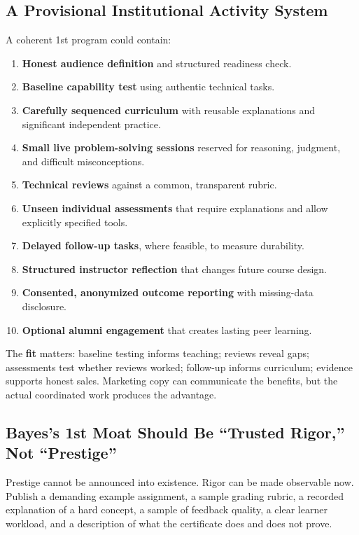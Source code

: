 \subsection{A Provisional Institutional Activity System}
\label{sec:provisional_activity_system}

A coherent 1st program could contain:
\begin{enumerate}
    \item \textbf{Honest audience definition} and structured readiness check.
    \item \textbf{Baseline capability test} using authentic technical tasks.
    \item \textbf{Carefully sequenced curriculum} with reusable explanations and significant independent practice.
    \item \textbf{Small live problem-solving sessions} reserved for reasoning, judgment, and difficult misconceptions.
    \item \textbf{Technical reviews} against a common, transparent rubric.
    \item \textbf{Unseen individual assessments} that require explanations and allow explicitly specified tools.
    \item \textbf{Delayed follow-up tasks}, where feasible, to measure durability.
    \item \textbf{Structured instructor reflection} that changes future course design.
    \item \textbf{Consented, anonymized outcome reporting} with missing-data disclosure.
    \item \textbf{Optional alumni engagement} that creates lasting peer learning.
\end{enumerate}

The \textbf{fit} matters: baseline testing informs teaching; reviews reveal gaps; assessments test whether reviews worked; follow-up informs curriculum; evidence supports honest sales. Marketing copy can communicate the benefits, but the actual coordinated work produces the advantage.

\subsection{Bayes's 1st Moat Should Be ``Trusted Rigor,'' Not ``Prestige''}
\label{sec:first_moat_trusted_rigor}

Prestige cannot be announced into existence. Rigor can be made observable now. Publish a demanding example assignment, a sample grading rubric, a recorded explanation of a hard concept, a sample of feedback quality, a clear learner workload, and a description of what the certificate does and does not prove.

